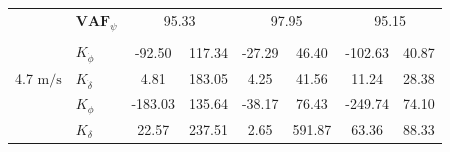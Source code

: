 \begin{table}[]
\begin{tabular}{llcccccc}
                                                   & $\mathbf{VAF}_\psi$                                                & \multicolumn{2}{c}{95.33}                                                                         & \multicolumn{2}{c}{97.95}                                                                         & \multicolumn{2}{c}{95.15}                                                                         \\
                                                   &                                                                    & \multicolumn{1}{l}{}                        & \multicolumn{1}{l}{}                                & \multicolumn{1}{l}{}                        & \multicolumn{1}{l}{}                                & \multicolumn{1}{l}{}                        & \multicolumn{1}{l}{}                                \\ \hline
                                                   & $K_{\dot{\phi}} $                                                  & -92.50                                      & 117.34                                              & -27.29                                      & 46.40                                               & -102.63                                     & 40.87                                               \\
    \multirow{-2}{*}{4.7 $\si{\meter\per\second}$} & $K_{\dot{\delta}}$                                                 & 4.81                                        & 183.05                                              & 4.25                                        & 41.56                                               & 11.24                                       & 28.38                                               \\
                                                   & $K_{\phi} $                                                        & -183.03                                     & 135.64                                              & -38.17                                      & 76.43                                               & -249.74                                     & 74.10                                               \\
                                                   & $K_\delta $                                                        & 22.57                                       & 237.51                                              & 2.65                                        & 591.87                                              & 63.36                                       & 88.33                                               \\

\end{tabular}
\end{table}
